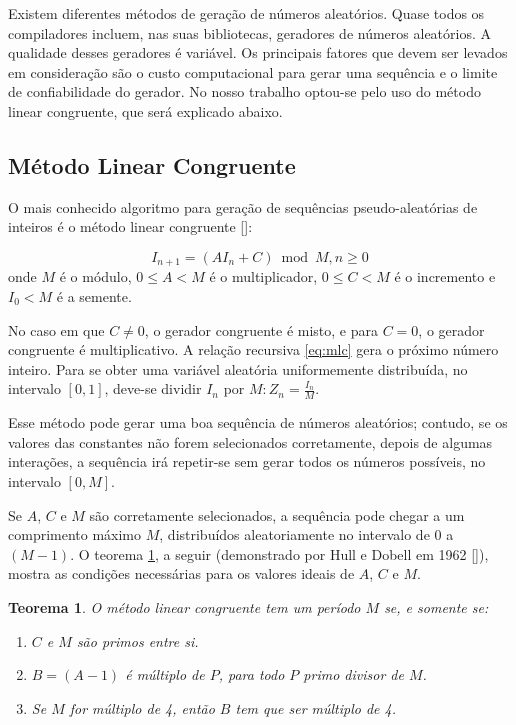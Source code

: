 \documentclass[brazil,ruledheader]{abnt}
\newtheorem{teorema}{Teorema}[chapter]
\renewcommand{\cite}[1]{[\citeonline{#1}]}
\begin{document}
Existem diferentes métodos de geração de números aleatórios. Quase todos os
compiladores  incluem, nas suas bibliotecas, geradores de
números
aleatórios. A qualidade desses geradores é variável. Os principais fatores que
devem ser levados em consideração são o custo computacional para gerar uma
sequência e o limite de confiabilidade do gerador. No nosso trabalho optou-se
pelo uso do método linear congruente, que será explicado abaixo.

\subsection{Método Linear Congruente}

O mais conhecido algoritmo para geração de sequências pseudo-aleatórias de
inteiros é o método linear congruente \cite{KlGo06,Fi}:

\begin{equation}
\label{eq:mlc}
 I_{n+1}=(AI_n+C)\bmod{M},n \geq 0
\end{equation}
onde $M$ é o módulo, $0 \leq A<M$ é o multiplicador, $0 \leq C<M$ é o incremento
e $I_0<M$ é a semente. 

No caso em que $C \neq 0$, o gerador congruente é misto, e para $C=0$, o gerador
congruente é multiplicativo. A relação recursiva \ref{eq:mlc} gera o próximo
número inteiro. Para se obter uma variável aleatória uniformemente distribuída,
no intervalo $[0, 1]$, deve-se dividir $I_n$ por $ M:Z_n=\frac{I_n}{M} $.

Esse método pode gerar uma boa sequência de números aleatórios; contudo, se os
valores das constantes não forem selecionados corretamente, depois de algumas
interações, a sequência irá repetir-se sem gerar todos os números possíveis, no
intervalo $[0,M]$.

Se $A$, $C$ e $M$ são corretamente selecionados, a sequência pode chegar a um
comprimento máximo $M$, distribuídos aleatoriamente no intervalo de 0 a $(M-1)$.
O teorema \ref{te:mlc}, a seguir (demonstrado por Hull e Dobell em 1962
\cite{HuDo62}), mostra as condições necessárias para os valores ideais de $A$,
$C$ e $M$.

\begin{teorema}
\label{te:mlc}
 O método linear congruente tem um período $M$ se, e somente se:
\begin{enumerate}
\item[i.] $C$ e $M$ são primos entre si.
\item[ii.] $B=(A-1)$ é múltiplo de $P$, para todo $P$ primo divisor de $M$.
\item[iii.] Se $M$ for múltiplo de 4, então $B$ tem que ser múltiplo de 4.
\end{enumerate}
\end{teorema}
\end{document}
